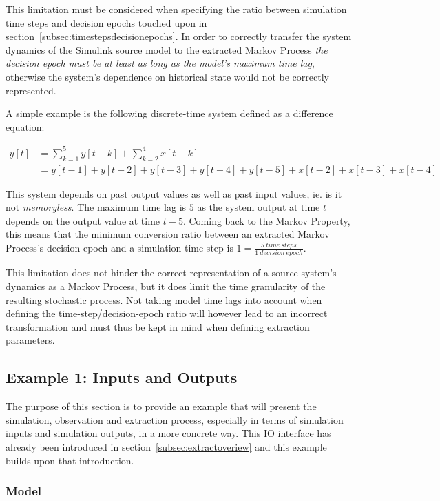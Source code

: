 This limitation must be considered when specifying the ratio between simulation time steps and decision epochs touched upon in section~\ref{subsec:timestepsdecisionepochs}. In order to correctly transfer the system dynamics of the Simulink source model to the extracted Markov Process \textit{the decision epoch must be at least as long as the model's maximum time lag}, otherwise the system's dependence on historical state would not be correctly represented.

A simple example is the following discrete-time system defined as a difference equation:

\begin{align}
y[t] &= \sum_{k=1}^{5} y[t-k] + \sum_{k=2}^{4} x[t-k] \nonumber \\
     &= y[t-1] + y[t-2] + y[t-3] + y[t-4] + y[t-5] + x[t-2] + x[t-3] + x[t-4] \nonumber
\end{align}     

This system depends on past output values as well as past input values, ie. is it not \textit{memoryless}. The maximum time lag is $5$ as the system output at time $t$ depends on the output value at time $t-5$. Coming back to the Markov Property, this means that the minimum conversion ratio between an extracted Markov Process's decision epoch and a simulation time step is $1=\frac{5\ time\ steps}{1\ decision\ epoch}$.

This limitation does not hinder the correct representation of a source system's dynamics as a Markov Process, but it does limit the time granularity of the resulting stochastic process. Not taking model time lags into account when defining the time-step/decision-epoch ratio will however lead to an incorrect transformation and must thus be kept in mind when defining extraction parameters.

\subsection{Example 1: Inputs and Outputs}
\label{subsec:ioexample}

The purpose of this section is to provide an example that will present the simulation, observation and extraction process, especially in terms of simulation inputs and simulation outputs, in a more concrete way. This IO interface has already been introduced in section~\ref{subsec:extractoveriew} and this example builds upon that introduction.

\subsubsection{Model}
\label{ex1model}

